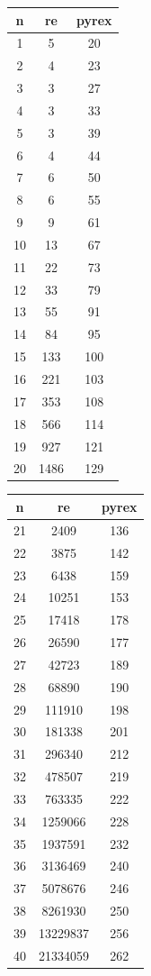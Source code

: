 \documentclass[a4paper,12pt,oneside,onecolumn]{uerj}
\begin{document}
\begin{center}
	\vline
	\begin{tabular}{ c || c | c }
		{\bf n} & {\bf re} & {\bf pyrex} \\
		\hline 
		1 & 5 & 20  \\ 
		2 & 4 & 23 \\ 
		3 & 3 & 27 \\ 
		4 & 3 & 33 \\ 
		5 & 3 & 39 \\ 
		6 & 4 & 44 \\ 
		7 & 6 & 50 \\ 
		8 & 6 & 55 \\ 
		9 & 9 & 61 \\ 
		10 & 13 & 67 \\ 
		11 & 22 & 73 \\ 
		12 & 33 & 79 \\ 
		13 & 55 & 91 \\ 
		14 & 84 & 95 \\ 
		15 & 133 & 100 \\ 
		16 & 221 & 103 \\ 
		17 & 353 & 108 \\ 
		18 & 566 & 114 \\ 
		19 & 927 & 121 \\ 
		20 & 1486 & 129 \\ 
	\end{tabular}
	\vline
	\quad
	\vline
	\begin{tabular}{ c || c | c }
		{\bf n} & {\bf re} & {\bf pyrex} \\
		\hline 
		21 & 2409 & 136 \\ 
		22 & 3875 & 142 \\ 
		23 & 6438 & 159 \\ 
		24 & 10251 & 153 \\ 
		25 & 17418 & 178 \\ 
		26 & 26590 & 177 \\ 
		27 & 42723 & 189 \\ 
		28 & 68890 & 190 \\ 
		29 & 111910 & 198 \\ 
		30 & 181338 & 201 \\ 
		31 & 296340 & 212 \\ 
		32 & 478507 & 219 \\ 
		33 & 763335 & 222 \\ 
		34 & 1259066 & 228 \\ 
		35 & 1937591 & 232 \\ 
		36 & 3136469 & 240 \\ 
		37 & 5078676 & 246 \\ 
		38 & 8261930 & 250 \\ 
		39 & 13229837 & 256 \\ 
		40 & 21334059 & 262 \\
	\end{tabular}
	\vline
\end{center}
\end{document}
